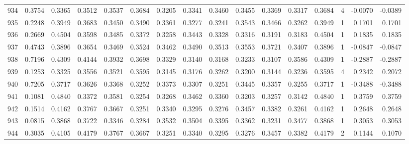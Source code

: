 \begin{tabular}{lrrrrrrrrrrrrrrr}
934 &      0.3754 &  0.3365 &  0.3512 &  0.3537 &  0.3684 &  0.3205 &  0.3341 &  0.3460 &  0.3455 &  0.3369 &   0.3317 &     0.3684 &      4 &                   -0.0070 &                    -0.0389 \\
935 &      0.2248 &  0.3949 &  0.3683 &  0.3450 &  0.3490 &  0.3361 &  0.3277 &  0.3241 &  0.3543 &  0.3466 &   0.3262 &     0.3949 &      1 &                    0.1701 &                     0.1701 \\
936 &      0.2669 &  0.4504 &  0.3598 &  0.3485 &  0.3372 &  0.3258 &  0.3443 &  0.3328 &  0.3316 &  0.3191 &   0.3183 &     0.4504 &      1 &                    0.1835 &                     0.1835 \\
937 &      0.4743 &  0.3896 &  0.3654 &  0.3469 &  0.3524 &  0.3462 &  0.3490 &  0.3513 &  0.3553 &  0.3721 &   0.3407 &     0.3896 &      1 &                   -0.0847 &                    -0.0847 \\
938 &      0.7196 &  0.4309 &  0.4144 &  0.3932 &  0.3698 &  0.3329 &  0.3140 &  0.3168 &  0.3233 &  0.3107 &   0.3586 &     0.4309 &      1 &                   -0.2887 &                    -0.2887 \\
939 &      0.1253 &  0.3325 &  0.3556 &  0.3521 &  0.3595 &  0.3145 &  0.3176 &  0.3262 &  0.3200 &  0.3144 &   0.3236 &     0.3595 &      4 &                    0.2342 &                     0.2072 \\
940 &      0.7205 &  0.3717 &  0.3626 &  0.3368 &  0.3252 &  0.3373 &  0.3307 &  0.3251 &  0.3445 &  0.3357 &   0.3255 &     0.3717 &      1 &                   -0.3488 &                    -0.3488 \\
941 &      0.1081 &  0.4840 &  0.3372 &  0.3581 &  0.3254 &  0.3268 &  0.3462 &  0.3360 &  0.3203 &  0.3257 &   0.3142 &     0.4840 &      1 &                    0.3759 &                     0.3759 \\
942 &      0.1514 &  0.4162 &  0.3767 &  0.3667 &  0.3251 &  0.3340 &  0.3295 &  0.3276 &  0.3457 &  0.3382 &   0.3261 &     0.4162 &      1 &                    0.2648 &                     0.2648 \\
943 &      0.0815 &  0.3868 &  0.3722 &  0.3346 &  0.3284 &  0.3532 &  0.3504 &  0.3395 &  0.3362 &  0.3231 &   0.3477 &     0.3868 &      1 &                    0.3053 &                     0.3053 \\
944 &      0.3035 &  0.4105 &  0.4179 &  0.3767 &  0.3667 &  0.3251 &  0.3340 &  0.3295 &  0.3276 &  0.3457 &   0.3382 &     0.4179 &      2 &                    0.1144 &                     0.1070 \\

\end{tabular}
